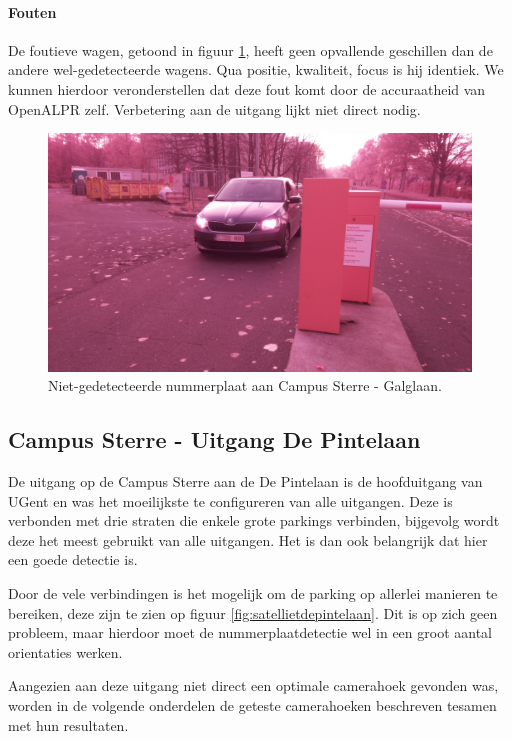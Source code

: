\paragraph{Fouten}
De foutieve wagen, getoond in figuur \ref{foutiefgalglaan}, heeft geen opvallende geschillen dan de andere wel-gedetecteerde wagens. Qua positie, kwaliteit, focus is hij identiek. We kunnen hierdoor veronderstellen dat deze fout komt door de accuraatheid van OpenALPR zelf. Verbetering aan de uitgang lijkt niet direct nodig.
\begin{figure}[h!]
	\centering
	\includegraphics[width=0.5\linewidth]{img/res-galglaan/galg1.jpg}
	\caption{Niet-gedetecteerde nummerplaat aan Campus Sterre - Galglaan.}
	\label{foutiefgalglaan}
\end{figure}

\subsection{Campus Sterre - Uitgang De Pintelaan}
De uitgang op de Campus Sterre aan de De Pintelaan is de hoofduitgang van UGent en was het moeilijkste te configureren van alle uitgangen. Deze is verbonden met drie straten die enkele grote parkings verbinden, bijgevolg wordt deze het meest gebruikt van alle uitgangen. Het is dan ook belangrijk dat hier een goede detectie is.

Door de vele verbindingen is het mogelijk om de parking op allerlei manieren te bereiken, deze zijn te zien op figuur \ref{fig:satellietdepintelaan}. Dit is op zich geen probleem, maar hierdoor moet de nummerplaatdetectie wel in een groot aantal orientaties werken.

Aangezien aan deze uitgang niet direct een optimale camerahoek gevonden was, worden in de volgende onderdelen de geteste camerahoeken beschreven tesamen met hun resultaten.

